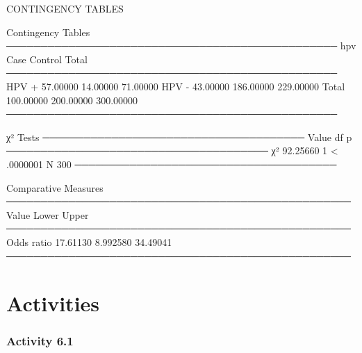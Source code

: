 \documentclass[
  a4paper,
]{memoir}
\newenvironment{Shaded}{\begin{snugshade}}{\end{snugshade}}
\newcommand{\DecValTok}[1]{\textcolor[rgb]{0.00,0.00,0.00}{#1}}
\newcommand{\FloatTok}[1]{\textcolor[rgb]{0.00,0.00,0.00}{#1}}
\newcommand{\NormalTok}[1]{\textcolor[rgb]{0.00,0.00,0.00}{#1}}
\newcommand{\SpecialCharTok}[1]{\textcolor[rgb]{0.00,0.00,0.00}{#1}}
\begin{document}
\begin{Shaded}
\begin{Highlighting}[]
\NormalTok{ CONTINGENCY TABLES}

\NormalTok{ Contingency Tables                               }
\NormalTok{ ──────────────────────────────────────────────── }
\NormalTok{   hpv      Case         Control      Total       }
\NormalTok{ ──────────────────────────────────────────────── }
\NormalTok{   HPV }\SpecialCharTok{+}     \FloatTok{57.00000}     \FloatTok{14.00000}     \FloatTok{71.00000}   
\NormalTok{   HPV }\SpecialCharTok{{-}}     \FloatTok{43.00000}    \FloatTok{186.00000}    \FloatTok{229.00000}   
\NormalTok{   Total    }\FloatTok{100.00000}    \FloatTok{200.00000}    \FloatTok{300.00000}   
\NormalTok{ ──────────────────────────────────────────────── }


\NormalTok{ χ² Tests                               }
\NormalTok{ ────────────────────────────────────── }
\NormalTok{         Value       df    p            }
\NormalTok{ ────────────────────────────────────── }
\NormalTok{   χ²    }\FloatTok{92.25660}     \DecValTok{1}    \SpecialCharTok{\textless{}}\NormalTok{ .}\DecValTok{0000001}   
\NormalTok{   N          }\DecValTok{300}                       
\NormalTok{ ────────────────────────────────────── }


\NormalTok{ Comparative Measures                               }
\NormalTok{ ────────────────────────────────────────────────── }
\NormalTok{                 Value       Lower       Upper      }
\NormalTok{ ────────────────────────────────────────────────── }
\NormalTok{   Odds ratio    }\FloatTok{17.61130}    \FloatTok{8.992580}    \FloatTok{34.49041}   
\NormalTok{ ────────────────────────────────────────────────── }
\end{Highlighting}
\end{Shaded}

\newpage{}


\chapter*{Activities}\label{activities-5}


\subsection*{Activity 6.1}\label{activity-6.1}
\end{document}

